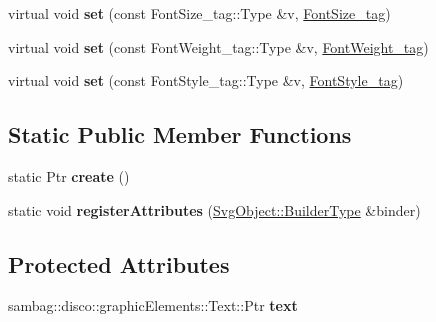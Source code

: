 \begin{DoxyCompactItemize}
\item 
\hypertarget{classsambag_1_1disco_1_1svg_1_1_svg_text_a83c66649f500922da15bcd9b48ec237f}{
virtual void {\bfseries set} (const FontSize\_\-tag::Type \&v, \hyperlink{structsambag_1_1disco_1_1svg_1_1_svg_text_1_1_font_size__tag}{FontSize\_\-tag})}
\label{classsambag_1_1disco_1_1svg_1_1_svg_text_a83c66649f500922da15bcd9b48ec237f}

\item 
\hypertarget{classsambag_1_1disco_1_1svg_1_1_svg_text_a1c759fddd1a728fe47dcb1c618d8b709}{
virtual void {\bfseries set} (const FontWeight\_\-tag::Type \&v, \hyperlink{structsambag_1_1disco_1_1svg_1_1_svg_text_1_1_font_weight__tag}{FontWeight\_\-tag})}
\label{classsambag_1_1disco_1_1svg_1_1_svg_text_a1c759fddd1a728fe47dcb1c618d8b709}

\item 
\hypertarget{classsambag_1_1disco_1_1svg_1_1_svg_text_a9991c32c32ac88253f350c5144cfee7b}{
virtual void {\bfseries set} (const FontStyle\_\-tag::Type \&v, \hyperlink{structsambag_1_1disco_1_1svg_1_1_svg_text_1_1_font_style__tag}{FontStyle\_\-tag})}
\label{classsambag_1_1disco_1_1svg_1_1_svg_text_a9991c32c32ac88253f350c5144cfee7b}

\end{DoxyCompactItemize}
\subsection*{Static Public Member Functions}
\begin{DoxyCompactItemize}
\item 
\hypertarget{classsambag_1_1disco_1_1svg_1_1_svg_text_a0515149c4c1206bd5067ed0eaa8be38b}{
static Ptr {\bfseries create} ()}
\label{classsambag_1_1disco_1_1svg_1_1_svg_text_a0515149c4c1206bd5067ed0eaa8be38b}

\item 
\hypertarget{classsambag_1_1disco_1_1svg_1_1_svg_text_af46f432db0e3e19de52b5f18058a21c2}{
static void {\bfseries registerAttributes} (\hyperlink{classsambag_1_1xml_1_1_x_m_l2_object}{SvgObject::BuilderType} \&binder)}
\label{classsambag_1_1disco_1_1svg_1_1_svg_text_af46f432db0e3e19de52b5f18058a21c2}

\end{DoxyCompactItemize}
\subsection*{Protected Attributes}
\begin{DoxyCompactItemize}
\item 
\hypertarget{classsambag_1_1disco_1_1svg_1_1_svg_text_aeab74d13737922a54dddfc223ba230fe}{
sambag::disco::graphicElements::Text::Ptr {\bfseries text}}
\label{classsambag_1_1disco_1_1svg_1_1_svg_text_aeab74d13737922a54dddfc223ba230fe}

\end{DoxyCompactItemize}


